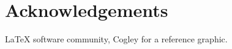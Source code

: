 \documentclass[review,jog]{igs}
\begin{document}


\section{Acknowledgements}

LaTeX software community, Cogley for a reference graphic.




\end{document}
